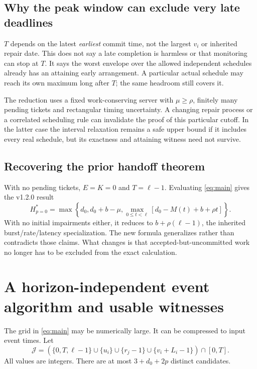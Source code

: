 \subsection{Why the peak window can exclude very late deadlines}
$T$ depends on the latest \emph{earliest} commit time, not the largest $v_i$ or inherited repair date. This does not say a late completion is harmless or that monitoring can stop at $T$. It says the worst envelope over the allowed independent schedules already has an attaining early arrangement. A particular actual schedule may reach its own maximum long after $T$; the same headroom still covers it.

The reduction uses a fixed work-conserving server with $\mu\ge\rho$, finitely many pending tickets and rectangular timing uncertainty. A changing repair process or a correlated scheduling rule can invalidate the proof of this particular cutoff. In the latter case the interval relaxation remains a safe upper bound if it includes every real schedule, but its exactness and attaining witness need not survive.

\subsection{Recovering the prior handoff theorem}
With no pending tickets, $E=K=0$ and $T=\ell-1$. Evaluating \cref{eq:main} gives the v1.2.0 result
\begin{equation}
H^*_{p=0}=\max\left\{d_0,d_0+b-\mu,
\max_{0\le t<\ell}[d_0-M(t)+b+\rho t]\right\}.
\end{equation}
With no initial impairments either, it reduces to $b+\rho(\ell-1)$, the inherited burst/rate/latency specialization. The new formula generalizes rather than contradicts those claims. What changes is that accepted-but-uncommitted work no longer has to be excluded from the exact calculation.

\section{A horizon-independent event algorithm and usable witnesses}
\label{sec:algorithm}
The grid in \cref{eq:main} may be numerically large. It can be compressed to input event times. Let
\begin{equation}
\mathcal J=\left(\{0,T,\ell-1\}\cup\{u_i\}\cup\{r_j-1\}\cup\{v_i+L_i-1\}\right)\cap[0,T].
\label{eq:events}
\end{equation}
All values are integers. There are at most $3+d_0+2p$ distinct candidates.

